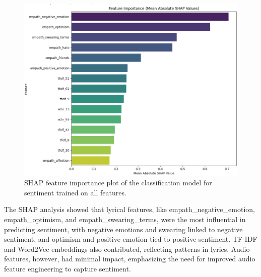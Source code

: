 \begin{center}
\begin{figure}[H]
  \centering
  \includegraphics[width=5in]{img/feature_importance_sentiment.png}
  \caption{SHAP feature importance plot of the classification model for
  sentiment trained on all features.}
  \label{Figure:fig_eh}
\end{figure}
\end{center}

The SHAP analysis showed that lyrical features, like empath_negative_emotion,
empath_optimism, and empath_swearing_terms, were the most influential in
predicting sentiment, with negative emotions and swearing linked to negative
sentiment, and optimism and positive emotion tied to positive sentiment. TF-IDF
and Word2Vec embeddings also contributed, reflecting patterns in lyrics. Audio
features, however, had minimal impact, emphasizing the need for improved audio
feature engineering to capture sentiment.

